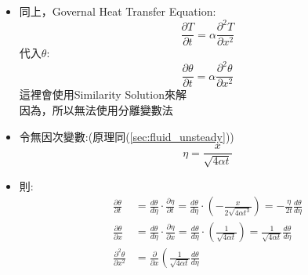 \documentclass[../main.tex]{subfiles}
\begin{document}
\begin{itemize}
\begin{itemize}
\begin{align}
      T(\infty,t) &= T_\infty \label{eq:heat_transfer_unsteady_semi_infinite_BC3}
    \end{align}
    這種有三個非齊次的，想辦法找到一個$\theta$，讓全部可以變成齊次或1\\
    令
    \begin{equation}
      \theta(x,t) = \frac{T(x,t) - T_\infty}{T_0 - T_\infty}
    \end{equation}
    則邊界條件變成:
    \begin{align}
      \theta(x,0) &= 0 \label{eq:heat_transfer_unsteady_semi_infinite_BC4}\\
      \theta(0,t) &= 1 \label{eq:heat_transfer_unsteady_semi_infinite_BC5}\\
      \theta(\infty,t) &= 0 \label{eq:heat_transfer_unsteady_semi_infinite_BC6}
    \end{align}
    \item 同上，Governal Heat Transfer Equation:
    \begin{equation}
      \frac{\partial T}{\partial t} = \alpha \frac{\partial^2 T}{\partial x^2}
    \end{equation}
    代入$\theta$:
    \begin{equation}
      \frac{\partial \theta}{\partial t} = \alpha \frac{\partial^2 \theta}{\partial x^2}
    \end{equation}
    這裡會使用Similarity Solution來解\\
    因為，所以無法使用分離變數法
    \item 令無因次變數:(原理同(\ref{sec:fluid_unsteady}))
    \begin{equation}
      \eta = \frac{x}{\sqrt{4 \alpha t}}
    \end{equation}
    \item 則:
    \begin{align}
      \frac{\partial \theta}{\partial t} &= \frac{d\theta}{d\eta} \cdot \frac{\partial \eta}{\partial t} = \frac{d\theta}{d\eta} \cdot \left(
        -\frac{x}{2 \sqrt{4 \alpha t^3}}
      \right) = -\frac{\eta}{2t} \frac{d\theta}{d\eta} \nonumber\\
      \frac{\partial \theta}{\partial x} &= \frac{d\theta}{d\eta} \cdot \frac{\partial \eta}{\partial x} = \frac{d\theta}{d\eta} \cdot \left(
        \frac{1}{\sqrt{4 \alpha t}}
      \right) = \frac{1}{\sqrt{4 \alpha t}} \frac{d\theta}{d\eta} \nonumber\\
      \frac{\partial^2 \theta}{\partial x^2} &= \frac{\partial}{\partial x} \left(
        \frac{1}{\sqrt{4 \alpha t}} \frac{d\theta}{d\eta}

\end{align}
\end{itemize}
\end{itemize}
\end{document}

